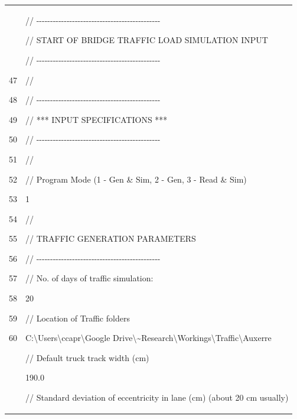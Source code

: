 \documentclass[
]{article}
\begin{document}
\begin{longtable}[]{@{}
  >{\centering\arraybackslash}p{}
  >{\raggedright\arraybackslash}p{}@{}}
46

47

48

49

50

51

52

53

54

55

56

57

58

59

60 & //
-\/-\/-\/-\/-\/-\/-\/-\/-\/-\/-\/-\/-\/-\/-\/-\/-\/-\/-\/-\/-\/-\/-\/-\/-\/-\/-\/-\/-\/-\/-\/-\/-\/-\/-\/-\/-\/-\/-\/-\/-\/-\/-\/-\/-

// START OF BRIDGE TRAFFIC LOAD SIMULATION INPUT

//
-\/-\/-\/-\/-\/-\/-\/-\/-\/-\/-\/-\/-\/-\/-\/-\/-\/-\/-\/-\/-\/-\/-\/-\/-\/-\/-\/-\/-\/-\/-\/-\/-\/-\/-\/-\/-\/-\/-\/-\/-\/-\/-\/-\/-

//

//
-\/-\/-\/-\/-\/-\/-\/-\/-\/-\/-\/-\/-\/-\/-\/-\/-\/-\/-\/-\/-\/-\/-\/-\/-\/-\/-\/-\/-\/-\/-\/-\/-\/-\/-\/-\/-\/-\/-\/-\/-\/-\/-\/-\/-

// *** INPUT SPECIFICATIONS ***

//
-\/-\/-\/-\/-\/-\/-\/-\/-\/-\/-\/-\/-\/-\/-\/-\/-\/-\/-\/-\/-\/-\/-\/-\/-\/-\/-\/-\/-\/-\/-\/-\/-\/-\/-\/-\/-\/-\/-\/-\/-\/-\/-\/-\/-

//

// Program Mode (1 - Gen \& Sim, 2 - Gen, 3 - Read \& Sim)

1

//

// TRAFFIC GENERATION PARAMETERS

//
-\/-\/-\/-\/-\/-\/-\/-\/-\/-\/-\/-\/-\/-\/-\/-\/-\/-\/-\/-\/-\/-\/-\/-\/-\/-\/-\/-\/-\/-\/-\/-\/-\/-\/-\/-\/-\/-\/-\/-\/-\/-\/-\/-\/-

// No. of days of traffic simulation:

20

// Location of Traffic folders

C:\textbackslash Users\textbackslash ccapr\textbackslash Google
Drive\textbackslash\textasciitilde Research\textbackslash Workings\textbackslash Traffic\textbackslash Auxerre

// Default truck track width (cm)

190.0

// Standard deviation of eccentricity in lane (cm) (about 20 cm usually)


\end{longtable}
\end{document}
